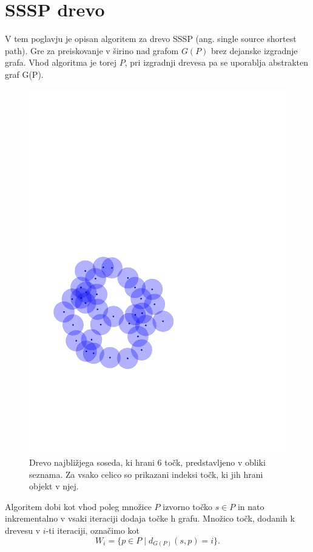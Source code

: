 \documentclass[a4paper, 12pt]{book}
\begin{document}
\section{SSSP drevo}

V tem poglavju je opisan algoritem za drevo SSSP (ang. single source shortest path). Gre za preiskovanje v širino nad grafom $G(P)$ brez dejanske izgradnje grafa. Vhod algoritma je torej $P$, pri izgradnji drevesa pa se uporablja abstrakten graf G(P).

\begin{figure}
\centerline{\includegraphics[scale=0.6,page=6]{pics/unitdisks.pdf}}
\caption{Drevo najbližjega soseda, ki hrani 6 točk, predstavljeno v obliki seznama. Za vsako celico so prikazani indeksi točk, ki jih hrani objekt v njej.}
\label{nnarray}
\end{figure}

Algoritem dobi kot vhod poleg množice $P$ izvorno točko $s\in P$ in nato inkrementalno v vsaki iteraciji dodaja točke h grafu. Množico točk, dodanih k drevesu v $i$-ti iteraciji, označimo kot
\[	W_i = \{ p\in P \mid d_{G(P)}(s,p) = i\}.
	\]
\end{document}

